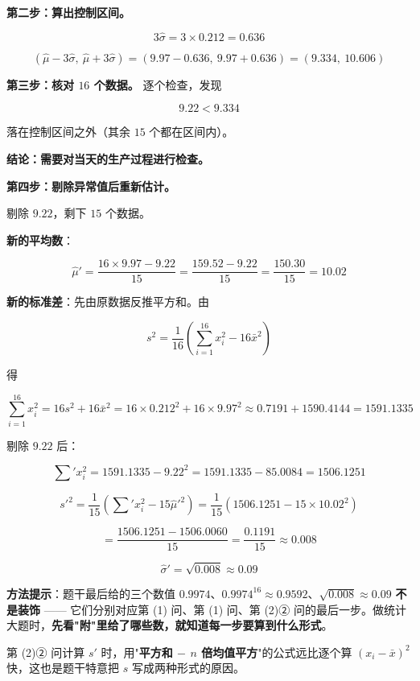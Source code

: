 \textbf{第二步：算出控制区间。}

\[3\hat\sigma=3\times0.212=0.636\]

\[\left(\hat\mu-3\hat\sigma,\ \hat\mu+3\hat\sigma\right)=(9.97-0.636,\ 9.97+0.636)=(9.334,\ 10.606)\]

\textbf{第三步：核对 $16$ 个数据。} 逐个检查，发现

\[9.22<9.334\]

落在控制区间之外（其余 $15$ 个都在区间内）。

\textbf{结论：需要对当天的生产过程进行检查。}

\textbf{第四步：剔除异常值后重新估计。}

剔除 $9.22$，剩下 $15$ 个数据。

\textbf{新的平均数}：

\[\hat\mu'=\frac{16\times9.97-9.22}{15}=\frac{159.52-9.22}{15}=\frac{150.30}{15}=10.02\]

\textbf{新的标准差}：先由原数据反推平方和。由

\[s^{2}=\frac1{16}\left(\sum_{i=1}^{16}x_i^{2}-16\bar x^{2}\right)\]

得

\[\sum_{i=1}^{16}x_i^{2}=16s^{2}+16\bar x^{2}=16\times0.212^{2}+16\times9.97^{2}\approx0.7191+1590.4144=1591.1335\]

剔除 $9.22$ 后：

\[\sum'x_i^{2}=1591.1335-9.22^{2}=1591.1335-85.0084=1506.1251\]

\[s'^{2}=\frac1{15}\left(\sum'x_i^{2}-15\hat\mu'^{2}\right)=\frac1{15}\left(1506.1251-15\times10.02^{2}\right)\]

\[=\frac{1506.1251-1506.0060}{15}=\frac{0.1191}{15}\approx0.008\]

\[\hat\sigma'=\sqrt{0.008}\approx0.09\]


\begin{gktip}
\textbf{方法提示}：题干最后给的三个数值 $0.9974$、$0.9974^{16}\approx0.9592$、$\sqrt{0.008}\approx0.09$ \textbf{不是装饰} —— 它们分别对应第 (1) 问、第 (1) 问、第 (2)② 问的最后一步。做统计大题时，\textbf{先看"附"里给了哪些数，就知道每一步要算到什么形式}。

第 (2)② 问计算 $s'$ 时，用"\textbf{平方和 $-$ $n$ 倍均值平方}"的公式远比逐个算 $\left(x_i-\bar x\right)^{2}$ 快，这也是题干特意把 $s$ 写成两种形式的原因。
\end{gktip}

\par\medskip

